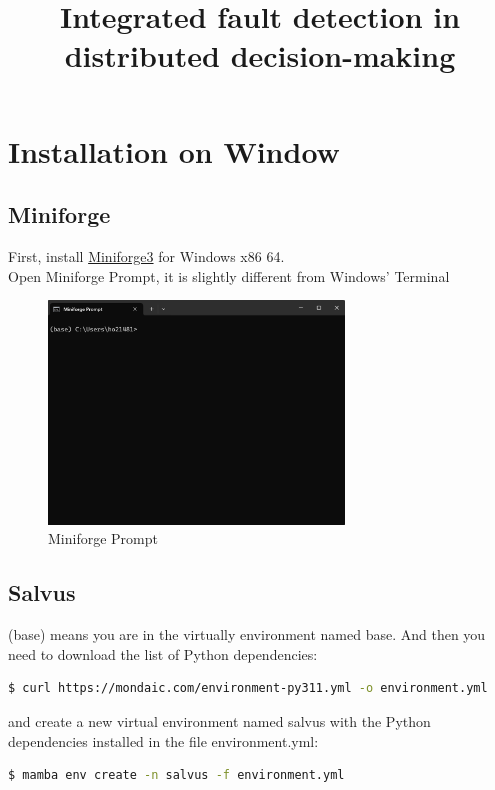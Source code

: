 \documentclass[a4paper, 12pt]{article}
\title{Integrated fault detection in distributed decision-making}
\theoremstyle{plain}
\begin{document}
\section{Installation on Window}
\subsection*{Miniforge}
First, install \href{https://github.com/conda-forge/miniforge}{Miniforge3} for Windows x86 64.\\
	
\noindent
Open Miniforge Prompt, it is slightly different from Windows' Terminal

\begin{figure}[H]
  \centering
  \includegraphics[width=0.7\textwidth]{Prompt}
  \caption{Miniforge Prompt}
\end{figure}


\subsection*{Salvus}

(base) means you are in the virtually environment named base. And then you need to download the list of Python dependencies:\\
\begin{lstlisting}[language=bash]
$ curl https://mondaic.com/environment-py311.yml -o environment.yml
\end{lstlisting}
\vspace{1cm}

\noindent
and create a new virtual environment named salvus with the Python dependencies installed in the file environment.yml:\\

\begin{lstlisting}[language=bash]
$ mamba env create -n salvus -f environment.yml
\end{lstlisting}
\vspace{1cm}
\end{document}
